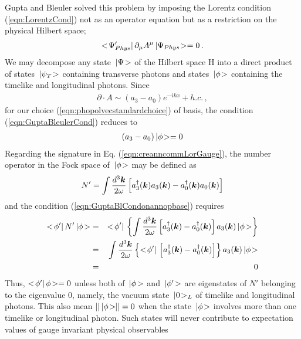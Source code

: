Gupta and Bleuler solved this problem by imposing the Lorentz condition 
(\ref{eqn:LorentzCond}) not as an operator equation but
as a restriction on the physical Hilbert space;
\begin{eqnarray}
<\! \Psi_{Phys}' |\,
\partial_\mu A^\mu
\,| \Psi_{Phys} \!>
=
0 \,.
\label{eqn:GuptaBleulerCond}
\end{eqnarray}
We may decompose any state $\,| \Psi \!>$ of the Hilbert space {\cal H}
into a direct product of states $\,| \psi_T \!>$ containing transverse photons and 
states $\,| \phi \!>$ containing the timelike and longitudinal photons.
Since
\begin{eqnarray*}
\partial \cdot A
\sim
(a_3 - a_0)  e^{-ikx} + h.c.\,,
\end{eqnarray*}
for our choice (\ref{eqn:phopolvecstandardchoice}) of basis,
the condition (\ref{eqn:GuptaBleulerCond}) reduces to
\begin{eqnarray}
(a_3 - a_0) \,| \phi \!> = 0
\label{eqn:GuptaBlCondonannopbase}
\end{eqnarray}
Regarding the signature in Eq. (\ref{eqn:creanncommLorGauge}), the number operator
in the Fock space of $\,| \phi \!>$ may be defined as
\begin{eqnarray}
N' = \int
\frac{d^3 \mbox{\boldmath $k$}}{2\omega}
\left[
a^\dagger_3(\mbox{\boldmath $k$}) a_3(\mbox{\boldmath $k$}) 
- 
a^\dagger_0(\mbox{\boldmath $k$}) a_0(\mbox{\boldmath $k$})
\right]
\end{eqnarray}
and the condition (\ref{eqn:GuptaBlCondonannopbase})
requires
\begin{eqnarray}
<\! \phi' |\,
N' \,| \phi \!>
&=&
<\! \phi' |\,
\left\{
\int
\frac{d^3 \mbox{\boldmath $k$}}{2\omega}
\left[
a^\dagger_3(\mbox{\boldmath $k$}) 
- 
a^\dagger_0(\mbox{\boldmath $k$}) 
\right]
a_3(\mbox{\boldmath $k$}) 
\,| \phi \!>
\right\}
\nonumber\\
&=&
\int
\frac{d^3 \mbox{\boldmath $k$}}{2\omega}
\left\{
<\! \phi' |\,
\left[
a^\dagger_3(\mbox{\boldmath $k$}) 
- 
a^\dagger_0(\mbox{\boldmath $k$}) 
\right]
\right\}
a_3(\mbox{\boldmath $k$}) 
\,| \phi \!>
\nonumber\\
&=&
0
\end{eqnarray}
Thus, $<\! \phi' |\, \phi \!> = 0$
unless both of $\,| \phi \!>$ and $\,| \phi' \!>$ are
eigenstates of  $N'$ belonging to the eigenvalue 0, namely,
the vacuum state $\,| 0 \!>_L$ of timelike and longitudinal photons.
This also mean $||\,| \phi \!> \!\!|| = 0$ when the state
$\,| \phi \!>$ involves more than one timelike or longitudinal photon.
Such states will never contribute to expectation values of 
gauge invariant physical observables
